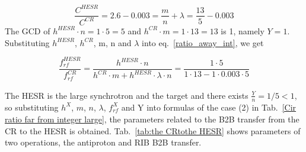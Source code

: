 \begin{equation}
\frac{C^{\mathit{HESR}}}{C^{\mathit{CR}}}=2.6-0.003=\frac{m}{n}+ \lambda = \frac{13}{5}-0.003
\end{equation}
The GCD of $h^{\mathit{HESR}}\cdot n=1\cdot5=5$ and $h^{\mathit{CR}} \cdot m=1\cdot 13=13$ is 1, namely $Y=1$. Substituting $h^{\mathit{HESR}}$, $h^{\mathit{CR}}$, m, n and $\lambda$ into eq.~\ref{ratio_away_int}, we get

\begin{equation} 
\frac{f_{\mathit{rf}}^{\mathit{HESR}}}{f_{\mathit{rf}}^{\mathit{CR}}}=\frac{h^{\mathit{HESR}}\cdot n}{h^{\mathit{CR}} \cdot m+ h^{\mathit{HESR}} \cdot\lambda\cdot n}=\frac{1\cdot 5}{1 \cdot 13- 1 \cdot 0.003\cdot 5}
\end{equation}

The HESR is the large synchrotron and the target and there exists $\frac{Y}{n}=1/5<1$, so substituting $h^X$, $m$, $n$, $\lambda$, $f_{\mathit{rf}}^{X}$ and Y into formulas of the case (2) in Tab.~\ref{Cir ratio far from integer large}, the parameters related to the B2B transfer from the CR to the HESR is obtained. Tab.~\ref{tab:the CRtothe HESR} shows parameters of two operations, the antiproton and RIB B2B transfer.


